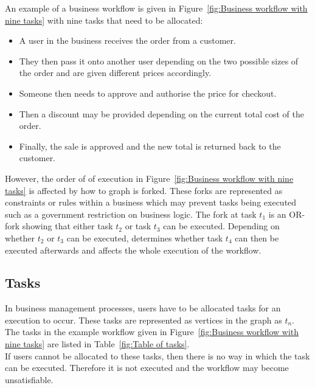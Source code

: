 \documentclass[a4paper]{report}
\begin{document}
An example of a business workflow is given in Figure~\ref{fig:Business workflow with nine tasks} with nine tasks that need to be allocated:
\begin{itemize}
\item A user in the business receives the order from a customer.
\item They then pass it onto another user depending on the two possible sizes of the order and are given different prices accordingly. 
\item Someone then needs to approve and authorise the price for checkout.
\item Then a discount may be provided depending on the current total cost of the order.
\item Finally, the sale is approved and the new total is returned back to the customer.
\end{itemize}

However, the order of of execution in Figure~\ref{fig:Business workflow with nine tasks} is affected by how to graph is forked. These forks are represented as constraints or rules within a business which may prevent tasks being executed such as a government restriction on business logic. The fork at task $t_{1}$ is an OR-fork showing that either task $t_{2}$ or task $t_{3}$ can be executed. Depending on whether $t_{2}$ or $t_{3}$ can be executed, determines whether task $t_{4}$ can then be executed afterwards and affects the whole execution of the workflow.  \\

\subsection{Tasks}
In business management processes, users have to be allocated tasks for an execution to occur. These tasks are represented as vertices in the graph as $t_{n}$. The tasks in the example workflow given in Figure~\ref{fig:Business workflow with nine tasks} are listed in Table~\ref{fig:Table of tasks}.\\

If users cannot be allocated to these tasks, then there is no way in which the task can be executed. Therefore it is not executed and the workflow may become unsatisfiable.\\
\end{document}
